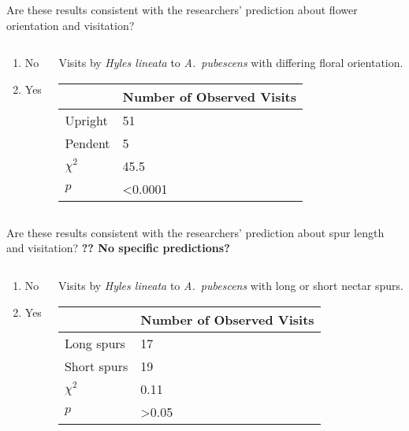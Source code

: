 \documentclass[t,hidelinks]{beamer}
\newcommand{\ques}[1]{\highlight{\textsc{q#1:}}}
\begin{document}
\begin{frame}[t]{\ques{11} Are these results consistent with the researchers’ prediction about flower orientation and visitation?}
	
	\begin{columns}[t]
		\begin{column}{0.28\textwidth}
			\begin{enumerate}
				\item No
				\item Yes
			\end{enumerate}
		\end{column}
		\begin{column}{0.5\textwidth}
	Visits by \textit{Hyles lineata} to \textit{A.~pubescens} with differing floral orientation.
	
	\begin{tabular}{L{0.6in}R{1in}}
		\toprule
		& Number of Observed Visits \tabularnewline
		\midrule
		Upright		&	51	 \tabularnewline
		Pendent		&	5	 \tabularnewline
		$\chi^2$	&	45.5 \tabularnewline
		$p$			&  \textless0.0001 \tabularnewline
		\bottomrule
	\end{tabular}
\end{column}
	\end{columns}
\end{frame}
%
\begin{frame}[t]{\ques{12} Are these results consistent with the researchers’ prediction about spur length and visitation? \textbf{?? No specific predictions?}}
	
	\begin{columns}[t]
		\begin{column}{0.28\textwidth}
			\begin{enumerate}
				\item No
				\item Yes
			\end{enumerate}
		\end{column}
		\begin{column}{0.5\textwidth}
			Visits by \textit{Hyles lineata} to \textit{A.~pubescens} with long or short nectar spurs.
			
			\begin{tabular}{L{0.6in}R{1in}}
				\toprule
				& Number of Observed Visits \tabularnewline
				\midrule
				Long spurs		&	17	 \tabularnewline
				Short spurs		&	19	 \tabularnewline
				$\chi^2$		&	0.11 \tabularnewline
				$p$				&  \textgreater0.05 \tabularnewline
				\bottomrule
			\end{tabular}
		\end{column}
	\end{columns}
\end{frame}
\end{document}
